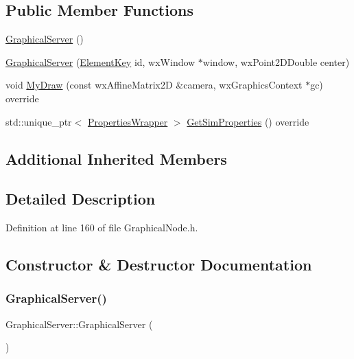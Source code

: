 \subsection*{Public Member Functions}
\begin{DoxyCompactItemize}
\item 
\hyperlink{class_graphical_server_a676ae0f9427d8dae12256c6203127541}{Graphical\+Server} ()
\item 
\hyperlink{class_graphical_server_a2690b914b1876f1eded21c1601803e93}{Graphical\+Server} (\hyperlink{_graphical_element_8h_ade5fd6c85839a416577ff9de1605141e}{Element\+Key} id, wx\+Window $\ast$window, wx\+Point2\+D\+Double center)
\item 
void \hyperlink{class_graphical_server_ad144b6cfdf945981fd0db425dfc41e5b}{My\+Draw} (const wx\+Affine\+Matrix2D \&camera, wx\+Graphics\+Context $\ast$gc) override
\item 
std\+::unique\+\_\+ptr$<$ \hyperlink{class_graphical_node_1_1_properties_wrapper}{Properties\+Wrapper} $>$ \hyperlink{class_graphical_server_a857655d34a7e3662100e7b86526e2855}{Get\+Sim\+Properties} () override
\end{DoxyCompactItemize}
\subsection*{Additional Inherited Members}


\subsection{Detailed Description}


Definition at line 160 of file Graphical\+Node.\+h.



\subsection{Constructor \& Destructor Documentation}
\mbox{\label{class_graphical_server_a676ae0f9427d8dae12256c6203127541}} 
\subsubsection{\texorpdfstring{Graphical\+Server()}{GraphicalServer()}\hspace{0.1cm}{\footnotesize\ttfamily [1/2]}}
{\footnotesize\ttfamily Graphical\+Server\+::\+Graphical\+Server (\begin{DoxyParamCaption}{ }\end{DoxyParamCaption})}




